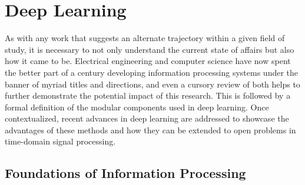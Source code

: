 

\graphicspath{{3/figures/}}

\chapter{Deep Learning}
\label{chp:background}


As with any work that suggests an alternate trajectory within a given field of study, it is necessary to not only understand the current state of affairs but also how it came to be.
Electrical engineering and computer science have now spent the better part of a century developing information processing systems under the banner of myriad titles and directions, and even a cursory review of both helps to further demonstrate the potential impact of this research.
This is followed by a formal definition of the modular components used in deep learning.
Once contextualized, recent advances in deep learning are addressed to showcase the advantages of these methods and how they can be extended to open problems in time-domain signal processing.


\section{Foundations of Information Processing}
\label{sec:foundations}

